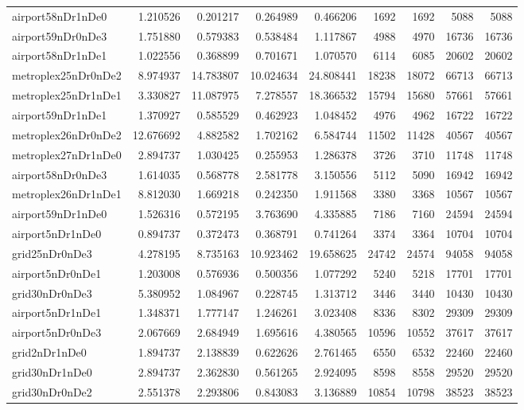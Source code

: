 \begin{longtable}{|l|r|r|r|r|r|r|r|r|}
airport58nDr1nDe0 & 1.210526 & 0.201217 & 0.264989 & 0.466206 & 1692 & 1692 & 5088 & 5088 \\
airport59nDr0nDe3 & 1.751880 & 0.579383 & 0.538484 & 1.117867 & 4988 & 4970 & 16736 & 16736 \\
airport58nDr1nDe1 & 1.022556 & 0.368899 & 0.701671 & 1.070570 & 6114 & 6085 & 20602 & 20602 \\
metroplex25nDr0nDe2 & 8.974937 & 14.783807 & 10.024634 & 24.808441 & 18238 & 18072 & 66713 & 66713 \\
metroplex25nDr1nDe1 & 3.330827 & 11.087975 & 7.278557 & 18.366532 & 15794 & 15680 & 57661 & 57661 \\
airport59nDr1nDe1 & 1.370927 & 0.585529 & 0.462923 & 1.048452 & 4976 & 4962 & 16722 & 16722 \\
metroplex26nDr0nDe2 & 12.676692 & 4.882582 & 1.702162 & 6.584744 & 11502 & 11428 & 40567 & 40567 \\
metroplex27nDr1nDe0 & 2.894737 & 1.030425 & 0.255953 & 1.286378 & 3726 & 3710 & 11748 & 11748 \\
airport58nDr0nDe3 & 1.614035 & 0.568778 & 2.581778 & 3.150556 & 5112 & 5090 & 16942 & 16942 \\
metroplex26nDr1nDe1 & 8.812030 & 1.669218 & 0.242350 & 1.911568 & 3380 & 3368 & 10567 & 10567 \\
airport59nDr1nDe0 & 1.526316 & 0.572195 & 3.763690 & 4.335885 & 7186 & 7160 & 24594 & 24594 \\
airport5nDr1nDe0 & 0.894737 & 0.372473 & 0.368791 & 0.741264 & 3374 & 3364 & 10704 & 10704 \\
grid25nDr0nDe3 & 4.278195 & 8.735163 & 10.923462 & 19.658625 & 24742 & 24574 & 94058 & 94058 \\
airport5nDr0nDe1 & 1.203008 & 0.576936 & 0.500356 & 1.077292 & 5240 & 5218 & 17701 & 17701 \\
grid30nDr0nDe3 & 5.380952 & 1.084967 & 0.228745 & 1.313712 & 3446 & 3440 & 10430 & 10430 \\
airport5nDr1nDe1 & 1.348371 & 1.777147 & 1.246261 & 3.023408 & 8336 & 8302 & 29309 & 29309 \\
airport5nDr0nDe3 & 2.067669 & 2.684949 & 1.695616 & 4.380565 & 10596 & 10552 & 37617 & 37617 \\
grid2nDr1nDe0 & 1.894737 & 2.138839 & 0.622626 & 2.761465 & 6550 & 6532 & 22460 & 22460 \\
grid30nDr1nDe0 & 2.894737 & 2.362830 & 0.561265 & 2.924095 & 8598 & 8558 & 29520 & 29520 \\
grid30nDr0nDe2 & 2.551378 & 2.293806 & 0.843083 & 3.136889 & 10854 & 10798 & 38523 & 38523 \\

\end{longtable}
